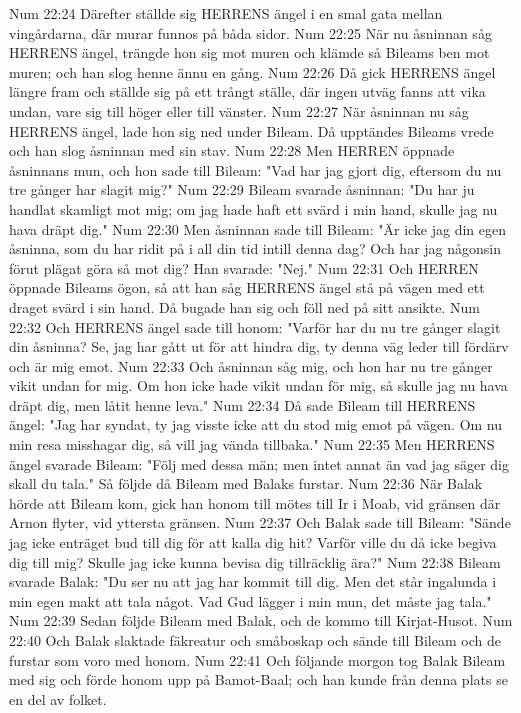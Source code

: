Num 22:24  Därefter ställde sig HERRENS ängel i en smal gata mellan vingårdarna, där murar funnos på båda sidor.
Num 22:25  När nu åsninnan såg HERRENS ängel, trängde hon sig mot muren och klämde så Bileams ben mot muren; och han slog henne ännu en gång.
Num 22:26  Då gick HERRENS ängel längre fram och ställde sig på ett trångt ställe, där ingen utväg fanns att vika undan, vare sig till höger eller till vänster.
Num 22:27  När åsninnan nu såg HERRENS ängel, lade hon sig ned under Bileam. Då upptändes Bileams vrede och han slog åsninnan med sin stav.
Num 22:28  Men HERREN öppnade åsninnans mun, och hon sade till Bileam: "Vad har jag gjort dig, eftersom du nu tre gånger har slagit mig?"
Num 22:29  Bileam svarade åsninnan: "Du har ju handlat skamligt mot mig; om jag hade haft ett svärd i min hand, skulle jag nu hava dräpt dig."
Num 22:30  Men åsninnan sade till Bileam: "Är icke jag din egen åsninna, som du har ridit på i all din tid intill denna dag? Och har jag någonsin förut plägat göra så mot dig? Han svarade: "Nej."
Num 22:31  Och HERREN öppnade Bileams ögon, så att han såg HERRENS ängel stå på vägen med ett draget svärd i sin hand. Då bugade han sig och föll ned på sitt ansikte.
Num 22:32  Och HERRENS ängel sade till honom: "Varför har du nu tre gånger slagit din åsninna? Se, jag har gått ut för att hindra dig, ty denna väg leder till fördärv och är mig emot.
Num 22:33  Och åsninnan såg mig, och hon har nu tre gånger vikit undan for mig. Om hon icke hade vikit undan för mig, så skulle jag nu hava dräpt dig, men låtit henne leva."
Num 22:34  Då sade Bileam till HERRENS ängel: "Jag har syndat, ty jag visste icke att du stod mig emot på vägen. Om nu min resa misshagar dig, så vill jag vända tillbaka."
Num 22:35  Men HERRENS ängel svarade Bileam: "Följ med dessa män; men intet annat än vad jag säger dig skall du tala." Så följde då Bileam med Balaks furstar.
Num 22:36  När Balak hörde att Bileam kom, gick han honom till mötes till Ir i Moab, vid gränsen där Arnon flyter, vid yttersta gränsen.
Num 22:37  Och Balak sade till Bileam: "Sände jag icke enträget bud till dig för att kalla dig hit? Varför ville du då icke begiva dig till mig? Skulle jag icke kunna bevisa dig tillräcklig ära?"
Num 22:38  Bileam svarade Balak: "Du ser nu att jag har kommit till dig. Men det står ingalunda i min egen makt att tala något. Vad Gud lägger i min mun, det måste jag tala."
Num 22:39  Sedan följde Bileam med Balak, och de kommo till Kirjat-Husot.
Num 22:40  Och Balak slaktade fäkreatur och småboskap och sände till Bileam och de furstar som voro med honom.
Num 22:41  Och följande morgon tog Balak Bileam med sig och förde honom upp på Bamot-Baal; och han kunde från denna plats se en del av folket.
